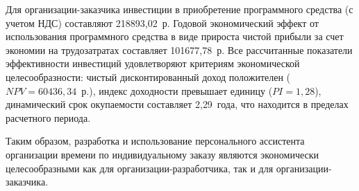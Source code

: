 Для организации-заказчика инвестиции в приобретение программного средства (с учетом НДС) составляют 218893{,}02~р. Годовой экономический эффект от использования программного средства в виде прироста чистой прибыли за счет экономии на трудозатратах составляет 101677{,}78~р. Все рассчитанные показатели эффективности инвестиций удовлетворяют критериям экономической целесообразности: чистый дисконтированный доход положителен ($NPV = 60436{,}34$~р.), индекс доходности превышает единицу ($PI = 1{,}28$), динамический срок окупаемости составляет 2{,}29~года, что находится в пределах расчетного периода.

Таким образом, разработка и использование персонального ассистента организации времени по индивидуальному заказу являются экономически целесообразными как для организации-разработчика, так и для организации-заказчика.
